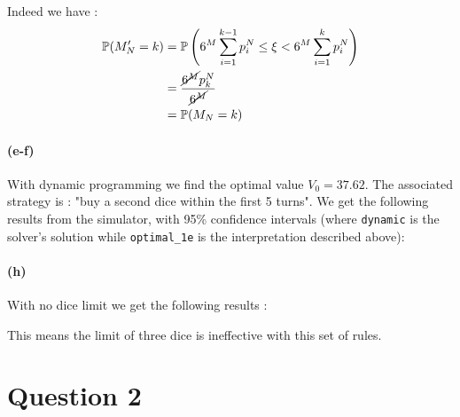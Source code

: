 \documentclass{article}
\newcommand{\getoutput}[1]{}
\begin{document}
    Indeed we have :
    \begin{align}
        \mathbb P(M_N'=k)&=
        \mathbb P\left(6^M\sum_{i=1}^{k-1}p^N_i\leq\xi<6^M\sum_{i=1}^kp^N_i\right)\\
                         &=\frac{\cancel{6^M}p^N_k}{\cancel{6^M}}\\
                         &=\mathbb P(M_N=k)
    \end{align}

    \paragraph{(e-f)}
    With dynamic programming we find the optimal value $V_0=37.62$.
    The associated strategy is : "buy a second dice within the first 5 turns".
    We get the following results from the simulator, with 95\% confidence intervals
    (where \texttt{dynamic} is the solver's solution while \texttt{optimal\_1e}
    is the interpretation described above):
    \getoutput{1e}

    \paragraph{(h)}
    With no dice limit we get the following results :
    \getoutput{1h}
    This means the limit of three dice is ineffective with this set of rules.

    \section*{Question 2}
\end{document}
